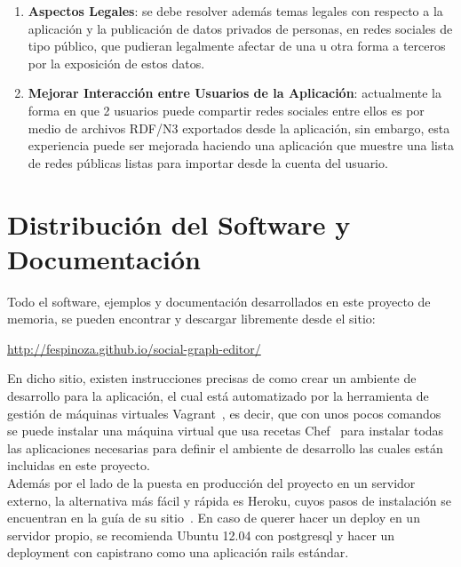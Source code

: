 \begin{enumerate}
    \item \textbf{Aspectos Legales}: se debe resolver además temas legales con respecto a la aplicación y la publicación de datos privados de personas, en redes sociales de tipo público, que pudieran legalmente afectar de una u otra forma a terceros por la exposición de estos datos.
    
    \item \textbf{Mejorar Interacción entre Usuarios de la Aplicación}: actualmente la forma en que 2 usuarios puede compartir redes sociales entre ellos es por medio de archivos RDF/N3 exportados desde la aplicación, sin embargo, esta experiencia puede ser mejorada haciendo una aplicación que muestre una lista de redes públicas listas para importar desde la cuenta del usuario.
    
  \end{enumerate}


\section{Distribución del Software y Documentación} %
\label{sec:distribucion_del_software_y_documentacion}

Todo el software, ejemplos y documentación desarrollados en este proyecto de memoria, se pueden encontrar y descargar libremente desde el sitio:\\

\begin{center}
  \url{http://fespinoza.github.io/social-graph-editor/}
\end{center}

En dicho sitio, existen instrucciones precisas de como crear un ambiente de desarrollo para la aplicación, el cual está automatizado por la herramienta de gestión de máquinas virtuales Vagrant~\cite{vagrant}, es decir, que con unos pocos comandos se puede instalar una máquina virtual que usa recetas Chef~\cite{chef} para instalar todas las aplicaciones necesarias para definir el ambiente de desarrollo las cuales están incluidas en este proyecto.\\

Además por el lado de la puesta en producción del proyecto en un servidor externo, la alternativa más fácil y rápida es Heroku, cuyos pasos de instalación se encuentran en la guía de su sitio~\cite{heroku}. En caso de querer hacer un deploy en un servidor propio, se recomienda Ubuntu 12.04 con postgresql y hacer un deployment con capistrano como una aplicación rails estándar.

